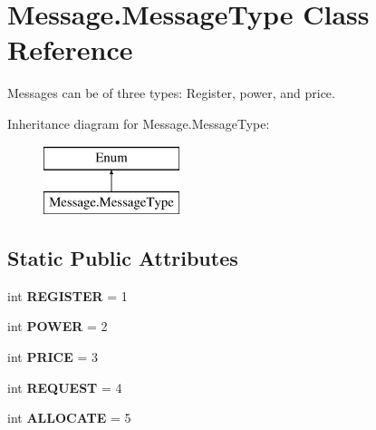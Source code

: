 \hypertarget{class_message_1_1_message_type}{}\section{Message.\+Message\+Type Class Reference}
\label{class_message_1_1_message_type}


Messages can be of three types\+: Register, power, and price.  


Inheritance diagram for Message.\+Message\+Type\+:\begin{figure}[H]
\begin{center}
\leavevmode
\includegraphics[height=2.000000cm]{class_message_1_1_message_type}
\end{center}
\end{figure}
\subsection*{Static Public Attributes}
\begin{DoxyCompactItemize}
\item 
\mbox{\label{class_message_1_1_message_type_a0d0bb9f07984aa93f046573f72a84035}} 
int {\bfseries R\+E\+G\+I\+S\+T\+ER} = 1
\item 
\mbox{\label{class_message_1_1_message_type_ae225efff6af9ca0747fe3a132f320c75}} 
int {\bfseries P\+O\+W\+ER} = 2
\item 
\mbox{\label{class_message_1_1_message_type_a99b0232e6ae0f357b5b0bd524c01415c}} 
int {\bfseries P\+R\+I\+CE} = 3
\item 
\mbox{\label{class_message_1_1_message_type_a7e25f21a4f68319bbe96aa9356b1d77f}} 
int {\bfseries R\+E\+Q\+U\+E\+ST} = 4
\item 
\mbox{\label{class_message_1_1_message_type_adf30ed0f375640a996f380adb3fc1e06}} 
int {\bfseries A\+L\+L\+O\+C\+A\+TE} = 5
\end{DoxyCompactItemize}


